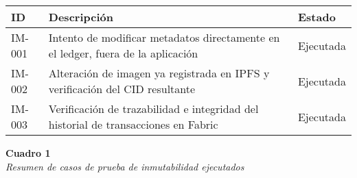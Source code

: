 \begin{center}
\begin{tabular}{|p{2cm}|p{6cm}|p{3cm}|}
    \hline
    \textbf{ID} & \textbf{Descripción} & \textbf{Estado} \\
    \hline
    IM-001 & Intento de modificar metadatos directamente en el ledger, fuera de la aplicación & Ejecutada \\
    \hline
    IM-002 & Alteración de imagen ya registrada en IPFS y verificación del CID resultante & Ejecutada \\
    \hline
    IM-003 & Verificación de trazabilidad e integridad del historial de transacciones en Fabric & Ejecutada \\
    \hline
\end{tabular}

\vspace{1em}
\noindent\textbf{Cuadro 1}\\[2em]
\textit{Resumen de casos de prueba de inmutabilidad ejecutados}
\end{center} 